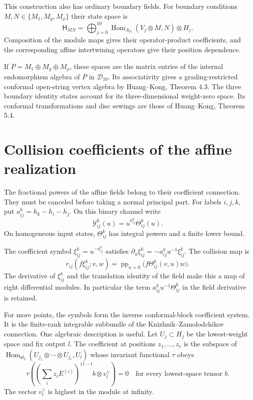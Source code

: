 This construction also has ordinary boundary fields. For boundary
conditions $M,N\in\{M_1,M_g,M_\rho\}$ their state space is
\[
 \mathsf H_{MN}=\bigoplus_{j=0}^{10}
 \operatorname{Hom}_{A_E}(V_j\otimes M,N)\otimes H_j.
\]
Composition of the module maps gives their operator-product
coefficients, and the corresponding affine intertwining operators give
their position dependence.

If $P=M_1\oplus M_g\oplus M_\rho$, these
spaces are the matrix entries of the internal endomorphism algebra of
$P$ in $\mathcal D_{10}$. Its associativity gives a grading-restricted
conformal open-string vertex algebra by Huang--Kong, Theorem 4.3.
The three boundary identity states account for its three-dimensional
weight-zero space. Its conformal transformations and disc sewings are
those of Huang--Kong, Theorem 5.4.

\section{Collision coefficients of the affine realization}
\label{v4-arith:asi:sec:e6-collisions}

The fractional powers of the affine fields belong to their coefficient
connection. They must be canceled before taking a normal principal
part. For labels $i,j,k$, put $a_{ij}^k=h_k-h_i-h_j$. On this binary
channel write
\[
 \mathcal Y^k_{ij}(u)=u^{a_{ij}^k}\Theta^k_{ij}(u).
\]
On homogeneous input states, $\Theta^k_{ij}$ has integral powers and
a finite lower bound.

The coefficient symbol $\xi_{ij}^k=u^{-a_{ij}^k}$
satisfies $\partial_u\xi_{ij}^k=-a_{ij}^ku^{-1}\xi_{ij}^k$.
The collision map is
\begin{equation}\label{v4-arith:asi:affine-residue}
 r_{ij}(f\xi_{ij}^k;v,w)
 =\operatorname{pp}_{u=0}\bigl(f\Theta^k_{ij}(v,u)w\bigr).
\end{equation}
The derivative of $\xi_{ij}^k$ and the translation identity of the field
make this a map of right differential modules. In particular the term
$a_{ij}^ku^{-1}\Theta^k_{ij}$ in the field derivative is retained.

For more points, the symbols form the inverse conformal-block
coefficient system. It is the finite-rank integrable subbundle of the
Knizhnik--Zamolodchikov connection. One algebraic description is useful.
Let $U_j\subset H_j$ be the lowest-weight space and fix output $l$.
The coefficient at positions $z_1,\ldots,z_r$ is the subspace of
$\operatorname{Hom}_{\mathfrak{sl}_2}(U_{j_1}\otimes\cdots\otimes U_{j_r},U_l)$
whose invariant functional $\tau$ obeys
\begin{equation}\label{v4-arith:asi:block-null}
 \tau\left(\left(\sum_i z_iE^{(i)}\right)^{11-l}b
                \otimes v_l^\vee\right)=0
 \quad\text{for every lowest-space tensor }b.
\end{equation}
The vector $v_l^\vee$ is highest in the module at infinity.


